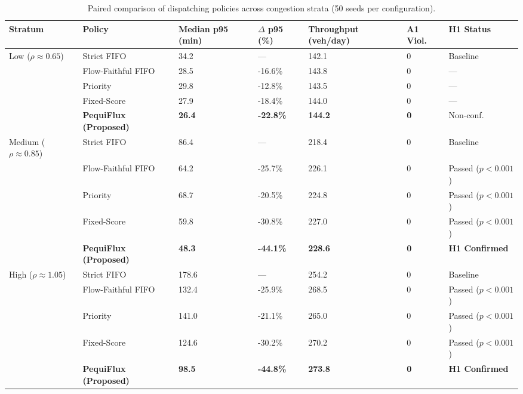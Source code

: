 \documentclass[12pt,a4paper]{article}
\begin{document}
\begin{table}[H]
\centering
\small
\renewcommand{\arraystretch}{1.2}
\caption{Paired comparison of dispatching policies across congestion strata (50 seeds per configuration).}
\label{tab:results-summary}
\begin{tabularx}{\textwidth}{@{}P{2.2cm}P{3.4cm}C{1.8cm}C{1.6cm}C{2.0cm}C{1.2cm}Y@{}}
\toprule
{}
\textbf{Stratum} & \textbf{Policy} & \textbf{Median p95 (min)} & \textbf{$\Delta$ p95 (\%)} & \textbf{Throughput (veh/day)} & \textbf{A1 Viol.} & \textbf{H1 Status} \\
\midrule
Low ($\rho \approx 0.65$) & Strict FIFO & 34.2 & --- & 142.1 & 0 & Baseline \\
 & Flow-Faithful FIFO & 28.5 & -16.6\% & 143.8 & 0 & --- \\
 & Priority & 29.8 & -12.8\% & 143.5 & 0 & --- \\
 & Fixed-Score & 27.9 & -18.4\% & 144.0 & 0 & --- \\
 & \textbf{PequiFlux (Proposed)} & \textbf{26.4} & \textbf{-22.8\%} & \textbf{144.2} & \textbf{0} & Non-conf. \\
\midrule
Medium ($\rho \approx 0.85$) & Strict FIFO & 86.4 & --- & 218.4 & 0 & Baseline \\
 & Flow-Faithful FIFO & 64.2 & -25.7\% & 226.1 & 0 & Passed ($p < 0.001$) \\
 & Priority & 68.7 & -20.5\% & 224.8 & 0 & Passed ($p < 0.001$) \\
 & Fixed-Score & 59.8 & -30.8\% & 227.0 & 0 & Passed ($p < 0.001$) \\
 & \textbf{PequiFlux (Proposed)} & \textbf{48.3} & \textbf{-44.1\%} & \textbf{228.6} & \textbf{0} & \textbf{H1 Confirmed} \\
\midrule
High ($\rho \approx 1.05$) & Strict FIFO & 178.6 & --- & 254.2 & 0 & Baseline \\
 & Flow-Faithful FIFO & 132.4 & -25.9\% & 268.5 & 0 & Passed ($p < 0.001$) \\
 & Priority & 141.0 & -21.1\% & 265.0 & 0 & Passed ($p < 0.001$) \\
 & Fixed-Score & 124.6 & -30.2\% & 270.2 & 0 & Passed ($p < 0.001$) \\
 & \textbf{PequiFlux (Proposed)} & \textbf{98.5} & \textbf{-44.8\%} & \textbf{273.8} & \textbf{0} & \textbf{H1 Confirmed} \\
\bottomrule
\end{tabularx}
\end{table}
\end{document}
